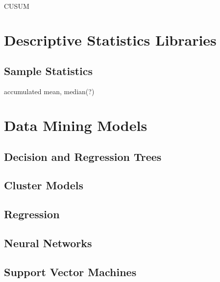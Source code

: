 \documentclass{article}
\begin{document}
CUSUM

\pagebreak

\section{Descriptive Statistics Libraries}

\subsection{Sample Statistics}

accumulated mean, median(?)

\pagebreak

\section{Data Mining Models}

\subsection{Decision and Regression Trees}

\subsection{Cluster Models}

\subsection{Regression}

\subsection{Neural Networks}

\subsection{Support Vector Machines}
\end{document}
